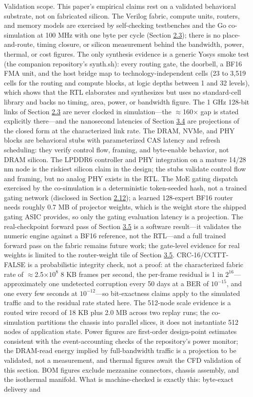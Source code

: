 \documentclass[10pt,twocolumn]{article}
\begin{document}
Validation scope. This paper's empirical claims rest on a validated behavioral substrate, not on fabricated silicon. The Verilog fabric, compute units, routers, and memory models are exercised by self-checking testbenches and the Go co-simulation at 100 MHz with one byte per cycle (Section \hyperref[sec:2.3]{2.3}); there is no place-and-route, timing closure, or silicon measurement behind the bandwidth, power, thermal, or cost figures. The only synthesis evidence is a generic Yosys smoke test (the companion repository's synth.sh): every routing gate, the doorbell, a BF16 FMA unit, and the host bridge map to technology-independent cells (23 to 3,519 cells for the routing and compute blocks, at logic depths between 1 and 32 levels), which shows that the RTL elaborates and synthesizes but uses no standard-cell library and backs no timing, area, power, or bandwidth figure. The 1 GHz 128-bit links of Section \hyperref[sec:2.3]{2.3} are never clocked in simulation---the $\approx$160$\times$ gap is stated explicitly there---and the nanosecond latencies of Section \hyperref[sec:3.4]{3.4} are projections of the closed form at the characterized link rate. The DRAM, NVMe, and PHY blocks are behavioral stubs with parameterized CAS latency and refresh scheduling: they verify control flow, framing, and byte-enable behavior, not DRAM silicon. The LPDDR6 controller and PHY integration on a mature 14/28 nm node is the riskiest silicon claim in the design; the stubs validate control flow and framing, but no analog PHY exists in the RTL. The MoE gating dispatch exercised by the co-simulation is a deterministic token-seeded hash, not a trained gating network (disclosed in Section \hyperref[sec:2.12]{2.12}); a learned 128-expert BF16 router needs roughly 0.7 MB of projector weights, which is the weight store the shipped gating ASIC provides, so only the gating evaluation latency is a projection. The real-checkpoint forward pass of Section \hyperref[sec:3.5]{3.5} is a software result---it validates the numeric engine against a BF16 reference, not the RTL---and a full trained forward pass on the fabric remains future work; the gate-level evidence for real weights is limited to the router-weight tile of Section \hyperref[sec:3.5]{3.5}. CRC-16/CCITT-FALSE is a probabilistic integrity check, not a proof: at the characterized fabric rate of $\approx$2.5$\times10^{8}$ 8 KB frames per second, the per-frame residual is 1 in $2^{16}$---approximately one undetected corruption every 50 days at a BER of $10^{-15}$, and one every few seconds at $10^{-12}$---so bit-exactness claims apply to the simulated traffic and to the residual rate stated here. The 512-node scale evidence is a routed wire record of 18 KB plus 2.0 MB across two replay runs; the co-simulation partitions the chassis into parallel slices, it does not instantiate 512 nodes of application state. Power figures are first-order design-point estimates consistent with the event-accounting checks of the repository's power monitor; the DRAM-read energy implied by full-bandwidth traffic is a projection to be validated, not a measurement, and thermal figures await the CFD validation of this section. BOM figures exclude mezzanine connectors, chassis assembly, and the isothermal manifold. What is machine-checked is exactly this: byte-exact delivery and 
\end{document}

